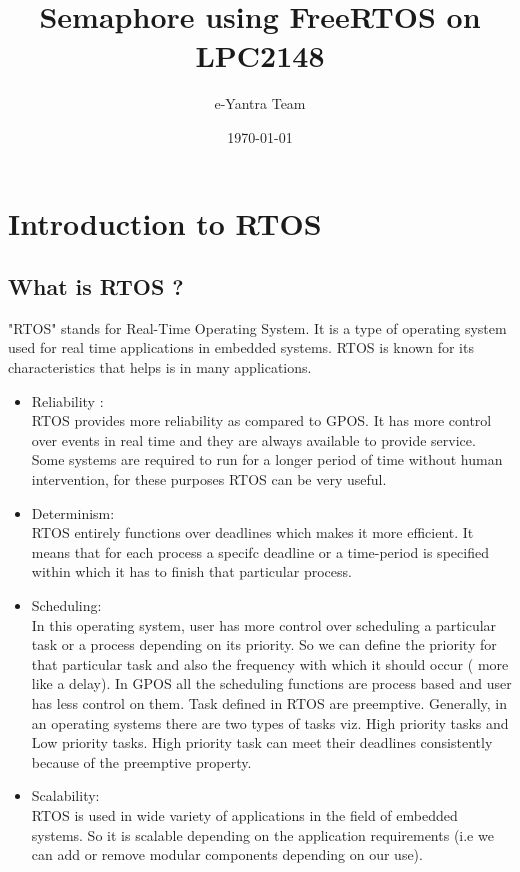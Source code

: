 \documentclass[11pt,a4paper]{article}
\title{Semaphore using FreeRTOS on LPC2148}
\author{e-Yantra Team}
\date{\today}
\begin{document}
	\maketitle
	\newpage
	\tableofcontents
	\newpage
	\section{Introduction to RTOS}
	\subsection{What is RTOS ?}
	"RTOS" stands for Real-Time Operating System.
	It is a type of operating system used for real time applications in embedded systems.
	RTOS is known for its characteristics that helps is in many applications.
	\begin{itemize}
		
		\item Reliability :\\
		RTOS provides more reliability as compared to GPOS.
		It has more control over events in real time and they are always available to provide service.
		Some systems are required to run for a longer period of time without human intervention, for these purposes RTOS can be very useful.
		
		\item Determinism:\\
		RTOS entirely functions over deadlines which makes            it more efficient.
		It means that for each process a specifc deadline or a time-period is specified within which it has to finish that particular process.
		
		\item Scheduling:\\
		In this operating system, user has more control over scheduling a particular task or a process depending on its priority.
		So we can define the priority for that particular  task and also the frequency with which it should occur ( more like a delay).
		In GPOS all the scheduling functions are process based and user has less control on them.
		Task defined in RTOS are preemptive. 
		Generally, in an operating systems there are two types of tasks viz. High priority tasks and Low priority tasks.
		High priority task can meet their deadlines consistently because of the preemptive property.
		
		\item Scalability:\\
		RTOS is used in wide variety of applications in the field of embedded systems.
		So it is scalable depending on the application requirements (i.e we can add or remove modular components depending on our use).
	\end{itemize}
	
\end{document}
